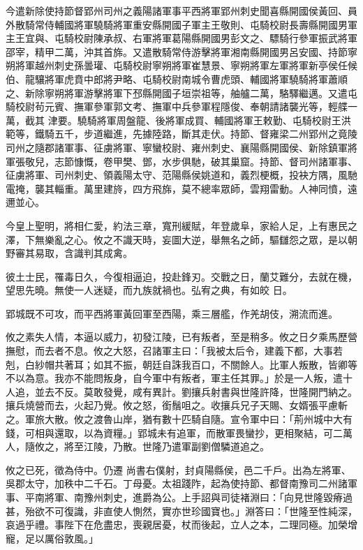 \begin{pinyinscope}
 今遣新除使持節督郢州司州之義陽諸軍事平西將軍郢州刺史聞喜縣開國侯黃回、員外散騎常侍輔國將軍驍騎將軍重安縣開國子軍主王敬則、屯騎校尉長壽縣開國男軍主王宜與、屯騎校尉陳承叔、右軍將軍葛陽縣開國男彭文之、驃騎行參軍振武將軍邵宰，精甲二萬，沖其首旆。又遣散騎常侍游擊將軍湘南縣開國男呂安國、持節寧朔將軍越州刺史孫曇瓘、屯騎校尉寧朔將軍崔慧景、寧朔將軍左軍將軍新亭侯任候伯、龍驤將軍虎賁中郎將尹略、屯騎校尉南城令曹虎頭、輔國將軍驍騎將軍蕭順之、新除寧朔將軍游擊將軍下邳縣開國子垣崇祖等，舳艫二萬，駱驛繼邁。又遣屯騎校尉茍元賓、撫軍參軍郭文考、撫軍中兵參軍程隱俊、奉朝請諸襲光等，輕艓一萬，截其
 津要。驍騎將軍周盤龍、後將軍成買、輔國將軍王敕勤、屯騎校尉王洪範等，鐵騎五千，步道繼進，先據陸路，斷其走伏。持節、督雍梁二州郢州之竟陵司州之隨郡諸軍事、征虜將軍、寧蠻校尉、雍州刺史、襄陽縣開國侯、新除鎮軍將軍張敬兒，志節慷慨，卷甲樊、鄧，水步俱馳，破其巢窟。持節、督司州諸軍事、征虜將軍、司州刺史、領義陽太守、范陽縣侯姚道和，義烈梗概，投袂方隅，風馳電掩，襲其輜重。萬里建旍，四方飛旆，莫不總率眾師，雲翔雷動。人神同憤，遠邇並心。



 今皇上聖明，將相仁愛，約法三章，寬刑緩賦，年登歲阜，家給人足，上有惠民之澤，下無樂亂之心。攸之不識天時，妄圖大逆，舉無名之師，驅讎怨之眾，是以朝野審其易取，含識判其成禽。



 彼土士民，罹毒日久，今復相逼迫，投赴鋒刃。交戰之日，蘭艾難分，去就在機，望思先曉。無使一人迷疑，而九族就禍也。弘宥之典，有如皎
 日。



 郢城既不可攻，而平西將軍黃回軍至西陽，乘三層艦，作羌胡伎，溯流而進。



 攸之素失人情，本逼以威力，初發江陵，已有叛者，至是稍多。攸之日夕乘馬歷營撫慰，而去者不息。攸之大怒，召諸軍主曰：「我被太后令，建義下都，大事若剋，白紗帽共著耳；如其不振，朝廷自誅我百口，不關餘人。比軍人叛散，皆卿等不以為意。我亦不能問叛身，自今軍中有叛者，軍主任其罪。」於是一人叛，遣十人追，並去不反。莫敢發覺，咸有異計。劉攘兵射書與世隆許降，世隆開門納之。攘兵燒營而去，火起乃覺。攸之怒，銜鬚咀之。收攘兵兄子天賜、女婿張平慮斬之。軍旅大散。攸之渡魯山岸，猶有數十匹騎自隨。宣令軍中曰：「荊州城中大有錢，可相與還取，以為資糧。」郢城未有追軍，而散軍畏蠻抄，更相聚結，可二萬人，隨攸之，將至江陵，乃散。世隆乃遣軍副劉僧驎道追之。



 攸之已死，徵為侍中。仍遷
 尚書右僕射，封貞陽縣侯，邑二千戶。出為左將軍、吳郡太守，加秩中二千石。丁母憂。太祖踐阼，起為使持節、都督南豫司二州諸軍事、平南將軍、南豫州刺史，進爵為公。上手詔與司徒褚淵曰：「向見世隆毀瘠過甚，殆欲不可復識，非直使人惻然，實亦世珍國寶也。」淵答曰：「世隆至性純深，哀過乎禮。事陛下在危盡忠，喪親居憂，杖而後起，立人之本，二理同極。加榮增寵，足以厲俗敦風。」




\end{pinyinscope}
